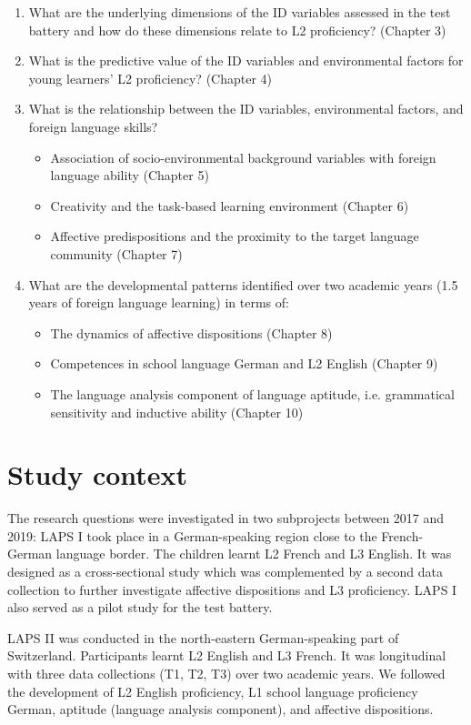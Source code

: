 \documentclass[output=paper]{langsci/langscibook}
\begin{document}
\begin{enumerate}
\item What are the underlying dimensions of the ID variables assessed in the test battery and how do these dimensions relate to L2 proficiency? (Chapter 3)
\item What is the predictive value of the ID variables and environmental factors for young learners’ L2 proficiency? (Chapter 4)
\item What is the relationship between the ID variables, environmental factors, and foreign language skills?
    \begin{itemize}
    \item Association of socio-environmental background variables with foreign language ability (Chapter 5)
    \item Creativity and the task-based learning environment (Chapter 6)
    \item Affective predispositions and the proximity to the target language community (Chapter 7)
    \end{itemize}
\item What are the developmental patterns identified over two academic years (1.5 years of foreign language learning) in terms of:
    \begin{itemize}
    \item The dynamics of affective dispositions (Chapter 8)
    \item Competences in school language German and L2 English (Chapter 9)
    \item The language analysis component of language aptitude, i.e. grammatical sensitivity and inductive ability (Chapter 10)
    \end{itemize}
\end{enumerate}

\section{Study context} 

The research questions were investigated in two subprojects between 2017 and 2019:  LAPS I took place in a German-speaking region close to the French-German language border. The children learnt L2 French and L3 English. It was designed as a cross-sectional study which was complemented by a second data collection to further investigate affective dispositions and L3 proficiency.  LAPS I also served as a pilot study for the test battery. 

LAPS II was conducted in the north-eastern German-speaking part of Switzerland. Participants learnt L2 English and L3 French. It was longitudinal with three data collections (T1, T2, T3) over two academic years. We followed the development of L2 English proficiency, L1 school language proficiency German, aptitude (language analysis component), and affective dispositions. 
\end{document}
